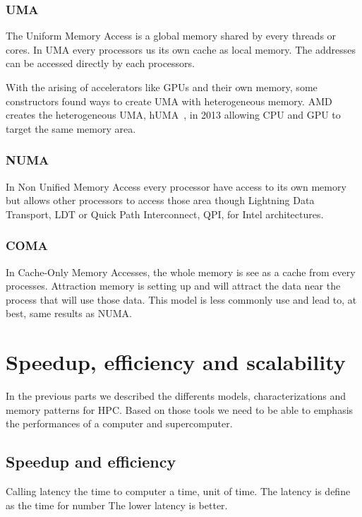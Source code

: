 \subsubsection{UMA}
The Uniform Memory Access is a global memory shared by every threads or cores. 
In UMA every processors us its own cache as local memory. 
The addresses can be accessed directly by each processors. 

With the arising of accelerators like GPUs and their own memory, some constructors found ways to create UMA with heterogeneous memory. 
AMD creates the heterogeneous UMA, hUMA~\cite{rogers2013amd}, in 2013 allowing CPU and GPU to target the same memory area.

\subsubsection{NUMA}

In Non Unified Memory Access every processor have access to its own memory but allows other processors to access those area though Lightning Data Transport, LDT or Quick Path Interconnect, QPI, for Intel architectures. 


\subsubsection{COMA}
In Cache-Only Memory Accesses, the whole memory is see as a cache from every processes.
Attraction memory is setting up and will attract the data near the process that will use those data. 
This model is less commonly use and lead to, at best, same results as NUMA.

\section{Speedup, efficiency and scalability}

In the previous parts we described the differents models, characterizations and memory patterns for HPC. 
Based on those tools we need to be able to emphasis the performances of a computer and supercomputer. 

\subsection{Speedup and efficiency}
Calling latency the time to computer a time, unit of time. 
The latency is define as the time for number
The lower latency is better. 

